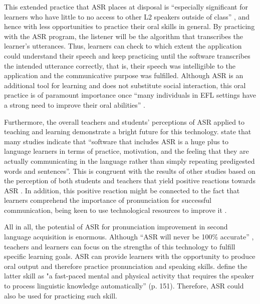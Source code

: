 \documentclass[english]{textolivre}
\begin{document}
This extended practice that ASR places at disposal is “especially significant for learners who have little to no access to other L2 speakers outside of class” \cite[p. 108]{dizontang2020}, and hence with less opportunities to practice their oral skills in general. By practicing with the ASR program, the listener will be the algorithm that transcribes the learner’s utterances. Thus, learners can check to which extent the application could understand their speech and keep practicing until the software transcribes the intended utterance correctly, that is, their speech was intelligible to the application and the communicative purpose was fulfilled. Although ASR is an additional tool for learning and does not substitute social interaction, this oral practice is of paramount importance once “many individuals in EFL settings have a strong need to improve their oral abilities” \cite[p. 60]{chen2011}.

Furthermore, the overall teachers and students’ perceptions of ASR applied to teaching and learning demonstrate a bright future for this technology. \textcite[p. 319]{levis2013} state that many studies indicate that “software that includes ASR is a huge plus to language learners in terms of practice, motivation, and the feeling that they are actually communicating in the language rather than simply repeating predigested words and sentences”. This is congruent with the results of other studies based on the perception of both students and teachers that yield positive reactions towards ASR \cite{chen2011, inceoglu2020}. In addition, this positive reaction might be connected to the fact that learners comprehend the importance of pronunciation for successful communication, being keen to use technological resources to improve it \cite{rogerson-revell2021}.

All in all, the potential of ASR for pronunciation improvement in second language acquisition is enormous. Although “ASR will never be 100\% accurate” \cite[p. 1641]{knill2018}, teachers and learners can focus on the strengths of this technology to fulfill specific learning goals. ASR can provide learners with the opportunity to produce oral output and therefore practice pronunciation and speaking skills. \textcite{chapelle2008} define the latter skill as "a fast-paced mental and physical activity that requires the speaker to process linguistic knowledge automatically” (p. 151). Therefore, ASR could also be used for practicing such skill.
\end{document}
